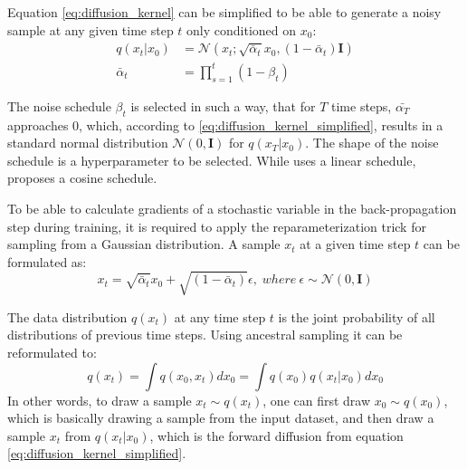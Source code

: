 Equation \eqref{eq:diffusion_kernel} can be simplified to be able to generate a noisy sample at any given time step $t$ only conditioned on $x_0$:
\begin{equation}
\label{eq:diffusion_kernel_simplified}
\begin{aligned}
q\left(x_{t}|x_{0}\right) &= \mathcal{N}\left(x_t;\sqrt{\bar{\alpha}_t}x_0,\left(1-\bar{\alpha}_t \right) \boldsymbol{I}\right) \\
\bar{\alpha}_t &= \prod_{s=1}^{t} \left(1-\beta_t\right)
\end{aligned}
\end{equation}

The noise schedule $\beta_{t}$ is selected in such a way, that for $T$ time steps, $\bar{\alpha_T}$ approaches 0, which, according to \eqref{eq:diffusion_kernel_simplified}, results in a standard normal distribution $\mathcal{N}\left(0,\boldsymbol{I}\right)$ for $q\left(x_{T}|x_{0}\right)$. The shape of the noise schedule is a hyperparameter to be selected. While \cite{ho_denoising_2020} uses a linear schedule, \cite{nichol_improved_2021} proposes a cosine schedule.

To be able to calculate gradients of a stochastic variable in the back-propagation step during training, it is required to apply the reparameterization trick for sampling from a Gaussian distribution. A sample $x_t$ at a given time step $t$ can be formulated as:
\begin{equation}
x_{t} = \sqrt{\bar{\alpha}_t}x_0 + \sqrt{\left(1-\bar{\alpha}_t\right)}\epsilon, \;  where \: \epsilon \sim \mathcal{N}\left(0,\boldsymbol{I}\right)
\end{equation}

The data distribution $q\left(x_{t}\right)$ at any time step $t$ is the joint probability of all distributions of previous time steps. Using ancestral sampling it can be reformulated to:
\begin{equation}
q\left(x_{t}\right) = \int q\left(x_{0},x_{t}\right) dx_0 = \int q\left(x_{0}\right) q\left(x_{t}|x_{0}\right) dx_0
\end{equation}
In other words, to draw a sample $x_t \sim q\left(x_{t}\right)$, one can first draw $x_0 \sim q\left(x_{0}\right)$, which is basically drawing a sample from the input dataset, and then draw a sample $x_t$ from $q\left(x_{t}|x_0\right)$, which is the forward diffusion from equation \eqref{eq:diffusion_kernel_simplified}. 


